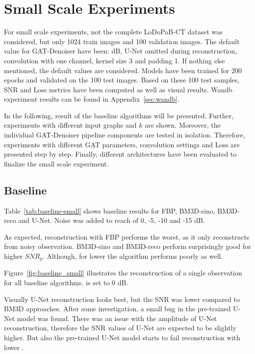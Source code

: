 \section{Small Scale Experiments}
For small scale experiments, not the complete LoDoPaB-CT dataset was considered, but only 1024 train images
and 100 validation images. 
The default value for GAT-Denoiser have been:  dB, U-Net omitted during reconstruction, 
convolution with one channel, kernel size 3 and padding 1. 
If nothing else mentioned, the default values are considered.
Models have been trained for 200 epochs and validated on the 100 test images. Based on these 100 test samples,
SNR and Loss metrics have been computed as well as visual results. 
Wandb experiment results can be found in Appendix~\ref{sec:wandb}.

In the following, result of the baseline algorithms will be presented.
Further, experiments with different input graphs and $k$ are shown. 
Moreover, the individual GAT-Denoiser pipeline components are tested in isolation.
Therefore, experiments with different GAT parameters, convolution settings and Loss are presented step by step.
Finally, different architectures have been evaluated to finalize the small scale experiment.


\subsection{Baseline}

Table~\ref{tab:baseline-small} shows baseline results for FBP, BM3D-sino, BM3D-reco and U-Net.
Noise was added to reach \snry of 0, -5, -10 and -15 dB.

As expected, reconstruction with FBP performs the worst, as it only reconstructs from noisy observation.
BM3D-sino and BM3D-reco perform surprisingly good for higher $\textit{SNR}_y$.
Although, for lower \snry the algorithm performs poorly as well.

Figure~\ref{fig:baseline_small} illustrates the reconstruction of a single
observation for all baseline algorithms. \snry is set to 0 dB.

Visually U-Net reconstruction looks best, but the SNR was lower compared to BM3D approaches.
After some investigation, a small bug in the pre-trained U-Net model was found.
There was an issue with the amplitude of U-Net reconstruction,
therefore the SNR values of U-Net are expected to be slightly higher.
But also the pre-trained U-Net model starts to fail reconstruction with lower \snry.


